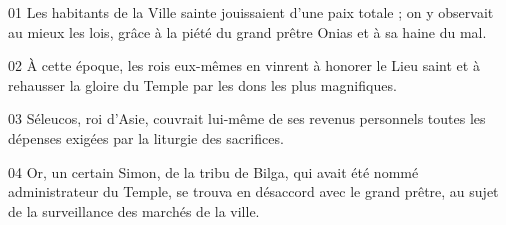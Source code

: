 01 Les habitants de la Ville sainte jouissaient d’une paix totale ; on y observait au mieux les lois, grâce à la piété du grand prêtre Onias et à sa haine du mal.

02 À cette époque, les rois eux-mêmes en vinrent à honorer le Lieu saint et à rehausser la gloire du Temple par les dons les plus magnifiques.

03 Séleucos, roi d’Asie, couvrait lui-même de ses revenus personnels toutes les dépenses exigées par la liturgie des sacrifices.

04 Or, un certain Simon, de la tribu de Bilga, qui avait été nommé administrateur du Temple, se trouva en désaccord avec le grand prêtre, au sujet de la surveillance des marchés de la ville.
